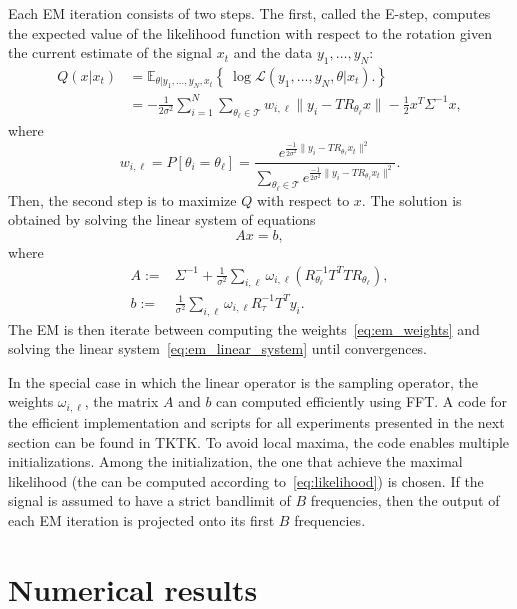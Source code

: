 \documentclass[english,12pt]{article}
\newcommand{\E}{\mathbb{E}}
\numberwithin{equation}{section}
\numberwithin{thm}{section} %
\begin{document}
Each EM iteration consists of two steps.
The first, called the E-step, computes the expected value of the likelihood function with respect to the rotation given the current estimate of the signal $x_t$ and the data $y_1,\ldots,y_N$:
\begin{equation}
\begin{split}
Q(x|x_t) &= \E_{\theta|y_1,\ldots,y_N,x_t}\left\{\ \log \mathcal{L}(y_1,\ldots,y_N,\theta|x_t).   \right\} \\
& = -\frac{1}{2\sigma^2}\sum_{i=1}^{N}\sum_{\theta_\ell\in\mathcal{T}}w_{i,\ell}\|y_i - TR_{\theta_\ell}x\| - \frac{1}{2}x^T\Sigma^{-1}x,
\end{split}
\end{equation} 
where 
\begin{equation} \label{eq:em_weights}
w_{i,\ell} = P[\theta_i = \theta_\ell] = \frac{e^{\frac{-1}{2\sigma^2}\|y_i-TR_{\theta_\ell} x_t\|^2 }}{\sum_{{\theta_\ell}\in\mathcal{T}}e^{\frac{-1}{2\sigma^2}\|y_i-TR_{\theta_\ell} x_t\|^2 }}.
\end{equation}
Then,  the second step is to maximize $Q$ with respect to $x$. 
The solution is obtained by solving the linear system of equations
\begin{equation} \label{eq:em_linear_system}
Ax = b,
\end{equation}
where 
\begin{align}
A :=&  \Sigma^{-1} + \frac{1}{\sigma^2}\sum_{i,\ell}\omega_{i,\ell} (R_{\theta_\ell}^{-1}T^TTR_{\theta_\ell}),\\ 
b :=&   \frac{1}{\sigma^2} \sum_{i,\ell}\omega_{i,\ell}R_\tau^{-1}T^Ty_i.
\end{align}
The EM is then iterate between computing the weights~\eqref{eq:em_weights} and solving the linear system~\eqref{eq:em_linear_system} until convergences. 

In the special case in which the linear operator is the sampling operator, the weights $\omega_{i,\ell}$, the matrix $A$ and $b$ can computed efficiently using FFT. A code for the efficient implementation and scripts for all experiments presented in the next section can be found in TKTK. To avoid local maxima, the code enables multiple initializations. Among the initialization, the one that achieve the maximal likelihood (the can be computed according to~\eqref{eq:likelihood}) is chosen. If the signal is assumed to have a strict bandlimit of $B$ frequencies, then the output of each EM iteration is projected onto its first $B$ frequencies.

\section{Numerical results}
\end{document}
